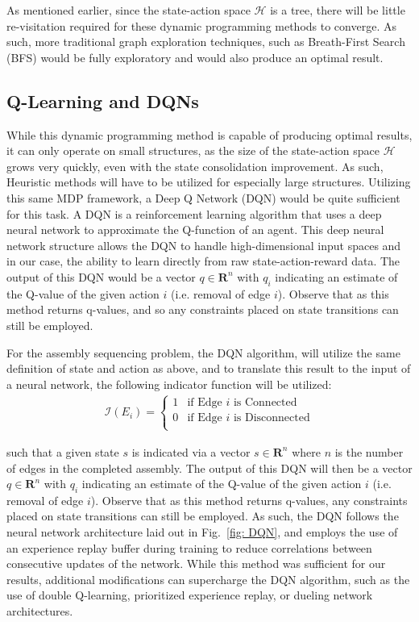 \documentclass{article}
\begin{document}
As mentioned earlier, since the state-action space $\mathcal{H}$ is a tree, there will be little re-visitation required for these dynamic programming methods to converge. As such, more traditional graph exploration techniques, such as Breath-First Search (BFS) would be fully exploratory and would also produce an optimal result.

\subsection{Q-Learning and DQNs}
While this dynamic programming method is capable of producing optimal results, it can only operate on small structures, as the size of the state-action space $\mathcal{H}$ grows very quickly, even with the state consolidation improvement. As such, Heuristic methods will have to be utilized for especially large structures. Utilizing this same MDP framework, a Deep Q Network (DQN) would be quite sufficient for this task. A DQN is a reinforcement learning algorithm that uses a deep neural network to approximate the Q-function of an agent. This deep neural network structure allows the DQN to handle high-dimensional input spaces and in our case, the ability to learn directly from raw state-action-reward data. The output of this DQN would be a vector $q \in \mathbf{R}^n$ with $q_i$ indicating an estimate of the Q-value of the given action $i$ (i.e. removal of edge $i$). Observe that as this method returns q-values, and so any constraints placed on state transitions can still be employed.

For the assembly sequencing problem, the DQN algorithm, will utilize the same definition of state and action as above, and to translate this result to the input of a neural network, the following indicator function will be utilized:
\begin{align*}
    \mathcal{I}(E_i) =
    \begin{cases}
        1 & \text{if Edge } i \text{ is Connected}\\
        0 & \text{if Edge } i \text{ is Disconnected}\\
    \end{cases}
\end{align*}

such that a given state $s$ is indicated via a vector $s \in \mathbf{R}^n$ where $n$ is the number of edges in the completed assembly. The output of this DQN will then be a vector $q \in \mathbf{R}^n$ with $q_i$ indicating an estimate of the Q-value of the given action $i$ (i.e. removal of edge $i$). Observe that as this method returns q-values, any constraints placed on state transitions can still be employed. As such, the DQN follows the neural network architecture laid out in Fig.~\ref{fig: DQN}, and employs the use of an experience replay buffer during training to reduce correlations between consecutive updates of the network. While this method was sufficient for our results, additional modifications can supercharge the DQN algorithm, such as the use of double Q-learning, prioritized experience replay, or dueling network architectures.
\end{document}
